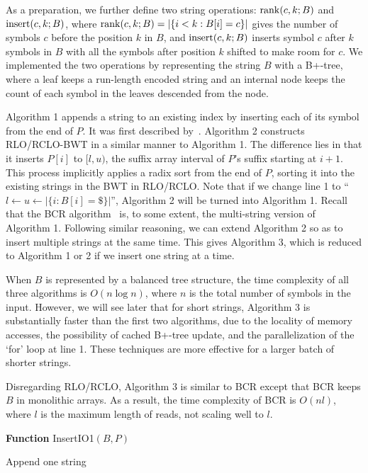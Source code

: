 \documentclass{bioinfo}
\begin{document}
\begin{methods}
As a preparation, we further define two string operations: ${\rm
rank}(c,k;B)$ and ${\rm insert}(c,k;B)$, where ${\rm
rank}(c,k;B)=|\{i<k:B[i]=c\}|$ gives the number of symbols $c$ before the
position $k$ in $B$, and ${\rm insert}(c,k;B)$ inserts symbol $c$ after $k$
symbols in $B$ with all the symbols after position $k$ shifted to make room for
$c$. We implemented the two operations by representing the string $B$ with a
B+-tree, where a leaf keeps a run-length encoded string and an internal node
keeps the count of each symbol in the leaves descended from the node.

Algorithm 1 appends a string to an existing index by inserting each of its
symbol from the end of $P$. It was first described
by~\citet{DBLP:conf/cpm/ChanHL04}. Algorithm 2 constructs RLO/RCLO-BWT
in a similar manner to Algorithm 1. The difference lies in that it inserts $P[i]$ to
$[l,u)$, the suffix array interval of $P$'s suffix starting at $i+1$. This process implicitly
applies a radix sort from the end of $P$, sorting it into the existing strings
in the BWT in RLO/RCLO.  Note that if we change line 1 to ``\mbox{$l\gets
u\gets|\{i:B[i]=\$\}|$}'', Algorithm 2 will be turned into Algorithm 1. Recall
that the BCR algorithm~\citep{DBLP:journals/tcs/BauerCR13} is, to some extent, the
multi-string version of Algorithm 1. Following similar reasoning, we can extend
Algorithm 2 so as to insert multiple strings at the same time. This gives Algorithm
3, which is reduced to Algorithm 1 or 2 if we insert one string at a time.

When $B$ is represented by a balanced tree structure, the time complexity of
all three algorithms is $O(n\log n)$, where $n$ is the total number of symbols
in the input. However, we will see later that for short strings, Algorithm 3 is
substantially faster than the first two algorithms, due to the locality of
memory accesses, the possibility of cached B+-tree update, and the
parallelization of the `for' loop at line 1.  These techniques are more
effective for a larger batch of shorter strings.

Disregarding RLO/RCLO, Algorithm 3 is similar to BCR except that BCR
keeps $B$ in monolithic arrays. As a result, the time complexity of
BCR is $O(nl)$, where $l$ is the maximum length of reads, not scaling well to $l$.

\begin{algorithm}[ht]
\DontPrintSemicolon
\footnotesize
{}
\BlankLine
\textbf{Function} {\sc InsertIO1}$(B,P)$
\caption{Append one string}
\end{algorithm}


\end{methods}
\end{document}
